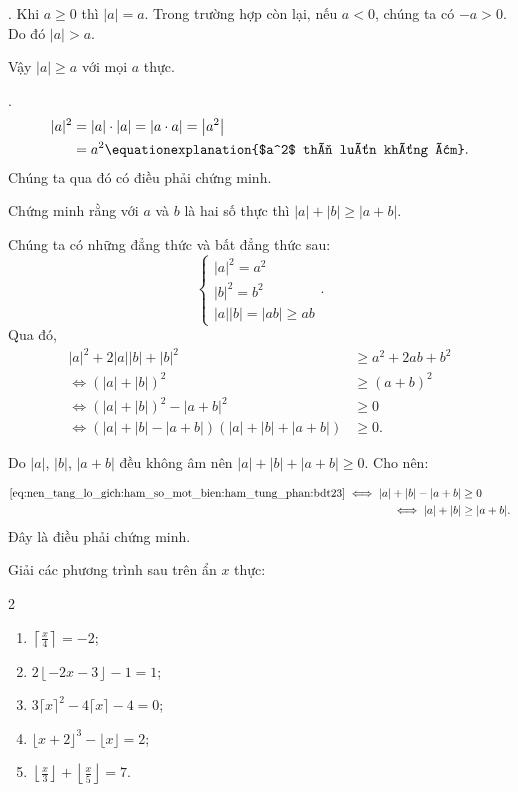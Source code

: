 \solution

\setcounter{subexercise}{1}
. Khi $a \geq 0$ thì $|a| = a$. Trong trường hợp còn lại, nếu $a < 0$, chúng ta có $-a > 0$. Do đó $|a| > a$.

Vậy $|a| \geq a$ với mọi $a$ thực.

. 
\begin{align*}
   |a|^2 &= |a|\cdot |a| = |a \cdot a| = \left|a^2\right|\\
   &= a^2 \equationexplanation{$a^2$ thì luôn không âm}.
\end{align*}
Chúng ta qua đó có điều phải chứng minh.

\exercise[bdttg] Chứng minh rằng với $a$ và $b$ là hai số thực thì $|a| + |b| \geq |a + b|$.

\solution[bdttg]

Chúng ta có những đẳng thức và bất đẳng thức sau:
\begin{equation*}
   \begin{cases}
      |a|^2 = a^2 \\
      |b|^2 = b^2 \\
      |a||b| = |ab| \geq ab
   \end{cases}.
\end{equation*}
Qua đó, 
\begin{align}
   |a|^2 + 2|a||b| + |b|^2 &\geq a^2 + 2ab + b^2 \nonumber\\
   \iff \left(|a| + |b|\right)^2 &\geq (a + b)^2 \nonumber\\
   \iff \left(|a| + |b|\right)^2 - \left|a + b\right|^2 &\geq 0 \nonumber\\
   \iff \left(|a| + |b| - |a + b|\right)\left(|a| + |b| + |a + b|\right) &\geq 0. \label{eq:nen_tang_lo_gich:ham_so_mot_bien:ham_tung_phan:bdt23}
\end{align}

Do $|a|$, $|b|$, $|a + b|$ đều không âm nên $|a| + |b| + |a + b| \geq 0$. Cho nên:

\begin{align*}
   \text{\eqref{eq:nen_tang_lo_gich:ham_so_mot_bien:ham_tung_phan:bdt23}} \iff |a| + |b| - |a + b| &\geq 0 \\
   \iff |a| + |b| &\geq |a + b|.
\end{align*}
Đây là điều phải chứng minh.

\exercise Giải các phương trình sau trên ẩn $x$ thực:

\begin{multicols}{2}
   \begin{enumerate}
      \item $\left\lceil \frac{x}{4} \right\rceil = -2$;
      \item $2\left\lfloor -2x - 3 \right\rfloor - 1 = 1$;
      \item $3\lceil x \rceil^2 - 4\lceil x \rceil - 4 = 0$;
      \item $\lfloor x + 2 \rfloor^3 - \lfloor x \rfloor = 2$;
      \item $\left\lfloor \frac{x}{3} \right\rfloor + \left\lfloor \frac{x}{5} \right\rfloor = 7$. 
   \end{enumerate}
\end{multicols}

